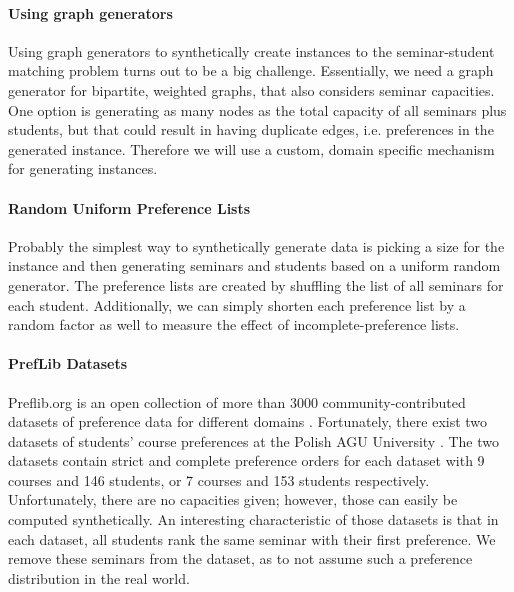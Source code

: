 \paragraph{Using graph generators}
Using graph generators to synthetically create instances to the seminar-student matching problem turns out to be a big challenge. Essentially, we need a graph generator for bipartite, weighted graphs, that also considers seminar capacities. One option is generating as many nodes as the total capacity of all seminars plus students, but that could result in having duplicate edges, i.e. preferences in the generated instance. Therefore we will use a custom, domain specific mechanism for generating instances.

\paragraph{Random Uniform Preference Lists}
Probably the simplest way to synthetically generate data is picking a size for the instance and then generating seminars and students based on a uniform random generator. The preference lists are created by shuffling the list of all seminars for each student. Additionally, we can simply shorten each preference list by a random factor as well to measure the effect of incomplete-preference lists.

\paragraph{PrefLib Datasets}
Preflib.org is an open collection of more than 3000 community-contributed datasets of preference data for different domains \cite{PrefLib}. Fortunately, there exist two datasets of students' course preferences at the Polish AGU University \cite{preflib-dataset}. The two datasets contain strict and complete preference orders for each dataset with 9 courses and 146 students, or 7 courses and 153 students respectively. Unfortunately, there are no capacities given; however, those can easily be computed synthetically. An interesting characteristic of those datasets is that in each dataset, all students rank the same seminar with their first preference. We remove these seminars from the dataset, as to not assume such a preference distribution in the real world.

